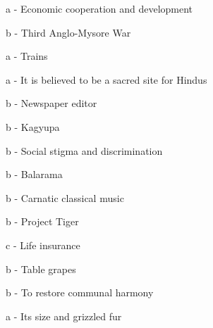 \documentclass[12pt,a4paper]{book}
\begin{document}
\begin{enhancedmcq}[Question 28]{a - Economic cooperation and development}
\end{enhancedmcq}

\begin{enhancedmcq}[Question 29]{b - Third Anglo-Mysore War}
\end{enhancedmcq}

\begin{enhancedmcq}[Question 30]{a - Trains}
\end{enhancedmcq}

\begin{enhancedmcq}[Question 31]{a - It is believed to be a sacred site for Hindus}
\end{enhancedmcq}

\begin{enhancedmcq}[Question 32]{b - Newspaper editor}
\end{enhancedmcq}

\begin{enhancedmcq}[Question 33]{b - Kagyupa}
\end{enhancedmcq}

\begin{enhancedmcq}[Question 34]{b - Social stigma and discrimination}
\end{enhancedmcq}

\begin{enhancedmcq}[Question 35]{b - Balarama}
\end{enhancedmcq}

\begin{enhancedmcq}[Question 36]{b - Carnatic classical music}
\end{enhancedmcq}

\begin{enhancedmcq}[Question 37]{b - Project Tiger}
\end{enhancedmcq}

\begin{enhancedmcq}[Question 38]{c - Life insurance}
\end{enhancedmcq}

\begin{enhancedmcq}[Question 39]{b - Table grapes}
\end{enhancedmcq}

\begin{enhancedmcq}[Question 40]{b - To restore communal harmony}
\end{enhancedmcq}

\begin{enhancedmcq}[Question 41]{a - Its size and grizzled fur}
\end{enhancedmcq}
\end{document}

